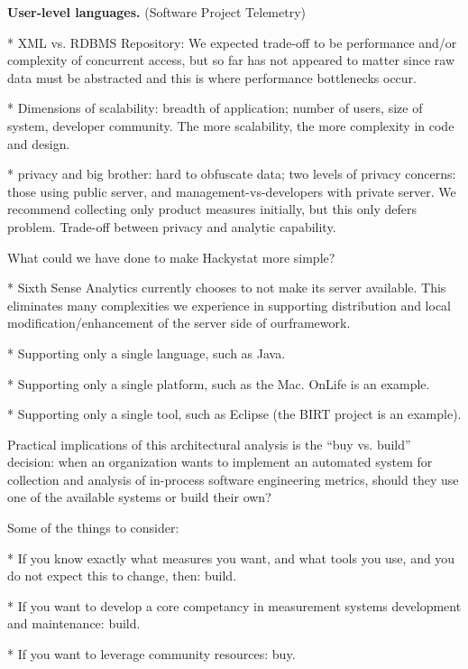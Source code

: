 \documentclass[10pt,twocolumn]{article}
\begin{document}

{\bf User-level languages.} (Software Project Telemetry)

* XML vs. RDBMS Repository: We expected trade-off to be performance and/or
  complexity of concurrent access, but so far has not appeared to matter
  since raw data must be abstracted and this is where performance
  bottlenecks occur.

* Dimensions of scalability: breadth of application; number of users, size
  of system, developer community. The more scalability, the more complexity
  in code and design.

* privacy and big brother: hard to obfuscate data; two levels of privacy
  concerns: those using public server, and management-vs-developers with
  private server. We recommend collecting only product measures initially,
  but this only defers problem. Trade-off between privacy and analytic
  capability.


What could we have done to make Hackystat more simple? 

* Sixth Sense Analytics currently chooses to not make its server
  available. This eliminates many complexities we experience in supporting
  distribution and local modification/enhancement of the server side of
  ourframework.

* Supporting only a single language, such as Java.

* Supporting only a single platform, such as the Mac. OnLife is an example.

* Supporting only a single tool, such as Eclipse (the BIRT project is an example).



Practical implications of this architectural analysis is the ``buy
vs. build'' decision: when an organization wants to implement an automated
system for collection and analysis of in-process software engineering
metrics, should they use one of the available systems or build their own? 

Some of the things to consider:

* If you know exactly what measures you want, and what tools you use, and you do not expect 
this to change, then: build.

* If you want to develop a core competancy in measurement systems development and maintenance: build.

* If you want to leverage community resources: buy.
\end{document}
